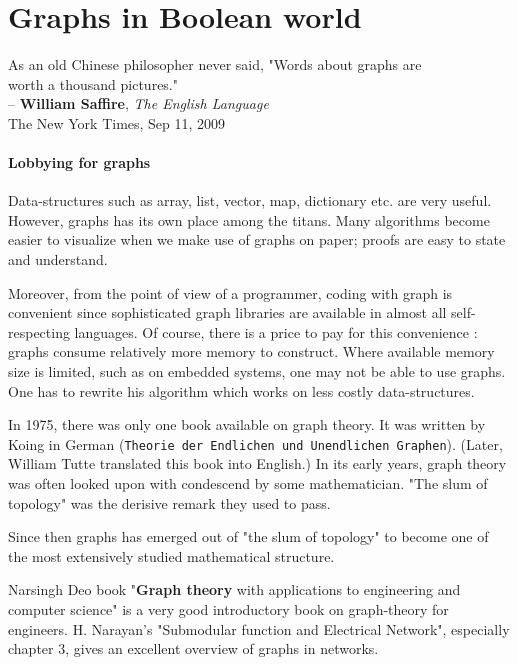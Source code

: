 \section{Graphs in Boolean world}
\label{sec:data_structure}

\begin{flushright}
  As an old Chinese philosopher never said, "Words about graphs are \\ worth a
  thousand pictures." \\ 
  -- \textbf{William Saffire}, \emph{The English Language} \\
  The New York Times, Sep 11, 2009
\end{flushright}

\paragraph{Lobbying for graphs}

  Data-structures such as array, list, vector, map, dictionary etc. are very
  useful. However, graphs has its own place among the titans.  Many
  algorithms become easier to visualize when we make use of graphs on paper;
  proofs are easy to state and understand. 

  Moreover, from the point of view of a programmer, coding with graph is
  convenient since sophisticated graph libraries are available in almost all
  self-respecting languages. Of course, there is a price to pay for this
  convenience : graphs consume relatively more memory to construct. Where
  available memory size is limited, such as on embedded systems, one may not be
  able to use graphs. One has to rewrite his algorithm which works on less costly
  data-structures.

  In 1975, there was only one book available on graph theory. It was written by
  Koing in German (\texttt{Theorie der Endlichen und Unendlichen Graphen}).
  (Later, William Tutte translated this book into English.) In
  its early years, graph theory was often looked upon with condescend by some
  mathematician. "The slum of topology" was the derisive remark they used to pass. 

  Since then graphs has emerged out of "the slum of topology" to become one of
  the most extensively studied mathematical structure.

  Narsingh Deo book "\textbf{Graph theory} with applications to engineering and
  computer science" is a very good introductory book on graph-theory for
  engineers. H. Narayan's "Submodular function and Electrical Network",
  especially chapter 3, gives an excellent overview of graphs in networks.
  
